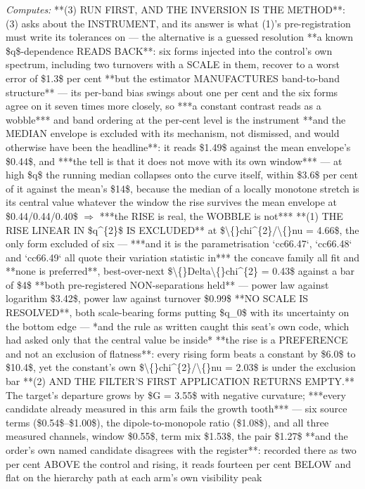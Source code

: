 \begin{description}
\emph{Computes:}  **(3) RUN FIRST, AND THE INVERSION IS THE METHOD**: (3) asks about the INSTRUMENT, and its answer is what (1)'s pre-registration must write its tolerances on --- the alternative is a guessed resolution   **a known \$q\$-dependence READS BACK**: six forms injected into the control's own spectrum, including two turnovers with a SCALE in them, recover to a worst error of \$1.3\$ per cent   **but the estimator MANUFACTURES band-to-band structure** --- its per-band bias swings about one per cent and the six forms agree on it seven times more closely, so ***a constant contrast reads as a wobble*** and band ordering at the per-cent level is the instrument   **and the MEDIAN envelope is excluded with its mechanism, not dismissed, and would otherwise have been the headline**: it reads \$1.49\$ against the mean envelope's \$0.44\$, and ***the tell is that it does not move with its own window*** --- at high \$q\$ the running median collapses onto the curve itself, within \$3.6\$ per cent of it against the mean's \$14\$, because the median of a locally monotone stretch is its central value whatever the window   the rise survives the mean envelope at \$0.44/0.44/0.40\$ \ensuremath{\Rightarrow} ***the RISE is real, the WOBBLE is not***   **(1) THE RISE LINEAR IN \$q\textasciicircum{}\{2\}\$ IS EXCLUDED** at \$\textbackslash\{\}chi\textasciicircum{}\{2\}/\textbackslash\{\}nu = 4.66\$, the only form excluded of six --- ***and it is the parametrisation `cc66.47`, `cc66.48` and `cc66.49` all quote their variation statistic in***  the concave family all fit and **none is preferred**, best-over-next \$\textbackslash\{\}Delta\textbackslash\{\}chi\textasciicircum{}\{2\} = 0.43\$ against a bar of \$4\$   **both pre-registered NON-separations held** --- power law against logarithm \$3.42\$, power law against turnover \$0.99\$   **NO SCALE IS RESOLVED**, both scale-bearing forms putting \$q\_0\$ with its uncertainty on the bottom edge ---  *and the rule as written caught this seat's own code, which had asked only that the central value be inside*   **the rise is a PREFERENCE and not an exclusion of flatness**: every rising form beats a constant by \$6.0\$ to \$10.4\$, yet the constant's own \$\textbackslash\{\}chi\textasciicircum{}\{2\}/\textbackslash\{\}nu = 2.03\$ is under the exclusion bar   **(2) AND THE FILTER'S FIRST APPLICATION RETURNS EMPTY.** The target's departure grows by \$G = 3.55\$ with negative curvature; ***every candidate already measured in this arm fails the growth tooth*** --- six source terms (\$0.54\$--\$1.00\$), the dipole-to-monopole ratio (\$1.08\$), and all three measured channels, window \$0.55\$, term mix \$1.53\$, the pair \$1.27\$   **and the order's own named candidate disagrees with the register**: recorded there as two per cent ABOVE the control and rising, it reads fourteen per cent BELOW and flat on the hierarchy path at each arm's own visibility peak

\end{description}
